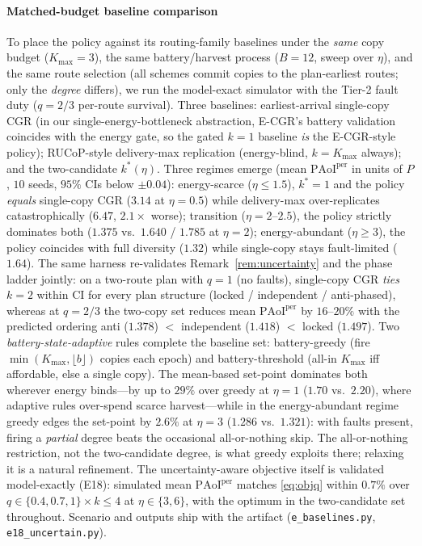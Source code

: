 \documentclass[twocolumn,3p,times,procedia]{elsarticle}
\newcommand{\PAoIper}{\mathrm{PAoI}^{\mathrm{per}}}
\newcommand{\kstar}{k^{\ast}}
\begin{document}
\paragraph*{Matched-budget baseline comparison}
To place the policy against its routing-family baselines under the
\emph{same} copy budget ($K_{\max}{=}3$), the same battery/harvest
process ($B{=}12$, sweep over $\eta$), and the same route selection
(all schemes commit copies to the plan-earliest routes; only the
\emph{degree} differs), we run the model-exact simulator with the
Tier-2 fault duty ($q{=}2/3$ per-route survival). Three baselines:
earliest-arrival single-copy CGR (in our single-energy-bottleneck
abstraction, E-CGR's battery validation~\cite{ecgr} coincides with the
energy gate, so the gated $k{=}1$ baseline \emph{is} the E-CGR-style
policy); RUCoP-style delivery-max replication (energy-blind,
$k{=}K_{\max}$ always); and the two-candidate $\kstar(\eta)$. Three
regimes emerge (mean $\PAoIper$ in units of $P$, $10$ seeds, $95\%$
CIs below $\pm0.04$): energy-scarce ($\eta\le1.5$), $\kstar{=}1$ and
the policy \emph{equals} single-copy CGR ($3.14$ at $\eta{=}0.5$)
while delivery-max over-replicates catastrophically ($6.47$,
$2.1\times$ worse); transition ($\eta{=}2$--$2.5$), the policy
strictly dominates both ($1.375$ vs.\ $1.640$ / $1.785$ at
$\eta{=}2$); energy-abundant ($\eta\ge3$), the policy coincides with
full diversity ($1.32$) while single-copy stays fault-limited
($1.64$). The same harness re-validates Remark~\ref{rem:uncertainty}
and the phase ladder jointly: on a two-route plan with $q{=}1$ (no
faults), single-copy CGR \emph{ties} $k{=}2$ within CI for every plan
structure (locked / independent / anti-phased), whereas at $q{=}2/3$
the two-copy set reduces mean $\PAoIper$ by $16$--$20\%$ with the
predicted ordering
anti ($1.378$) $<$ independent ($1.418$) $<$ locked ($1.497$).
Two \emph{battery-state-adaptive} rules complete the baseline set:
battery-greedy (fire $\min(K_{\max},\lfloor b\rfloor)$ copies each
epoch) and battery-threshold (all-in $K_{\max}$ iff affordable, else a
single copy). The mean-based set-point dominates both wherever energy
binds---by up to $29\%$ over greedy at $\eta{=}1$
($1.70$ vs.\ $2.20$), where adaptive rules over-spend scarce
harvest---while in the energy-abundant regime greedy edges the
set-point by $2.6\%$ at $\eta{=}3$ ($1.286$ vs.\ $1.321$): with
faults present, firing a \emph{partial} degree beats the occasional
all-or-nothing skip. The all-or-nothing restriction, not the
two-candidate degree, is what greedy exploits there; relaxing it is a
natural refinement.
The uncertainty-aware objective itself is validated model-exactly
(E18): simulated mean $\PAoIper$ matches \eqref{eq:objq} within
$0.7\%$ over $q\in\{0.4,0.7,1\}\times k\le4$ at $\eta\in\{3,6\}$, with
the optimum in the two-candidate set throughout.
Scenario and outputs ship with the artifact
(\texttt{e\_baselines.py}, \texttt{e18\_uncertain.py}).
\end{document}
